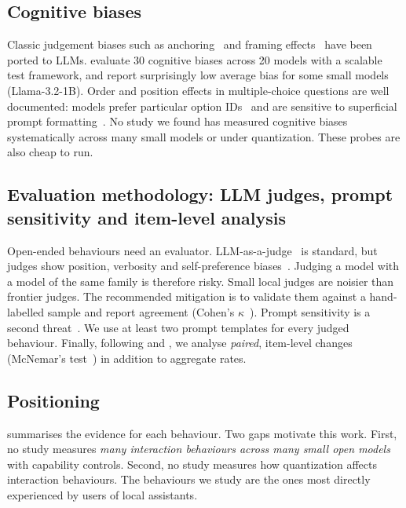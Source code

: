\subsection{Cognitive biases}
Classic judgement biases such as anchoring~\citep{tversky1974judgment} and framing
effects~\citep{tversky1981framing} have been ported to LLMs. \citet{malberg2024cognitive}
evaluate 30 cognitive biases across 20 models with a scalable test framework, and
report surprisingly low average bias for some small models (\eg Llama-3.2-1B). Order
and position effects in multiple-choice questions are well documented: models
prefer particular option IDs~\citep{zheng2024large} and are sensitive to superficial
prompt formatting~\citep{sclar2024quantifying}. No study we found has measured cognitive
biases systematically across many small models or under quantization. These probes
are also cheap to run.

\subsection{Evaluation methodology: LLM judges, prompt sensitivity and item-level analysis}
Open-ended behaviours need an evaluator. LLM-as-a-judge~\citep{zheng2023judging} is
standard, but judges show position, verbosity and self-preference
biases~\citep{wataoka2024selfpreference,ye2024justice}. Judging a model with a model of
the same family is therefore risky. Small local judges are noisier than frontier
judges. The recommended mitigation is to validate them against a hand-labelled
sample and report agreement (Cohen's $\kappa$~\citep{cohen1960coefficient}). Prompt
sensitivity is a second threat~\citep{sclar2024quantifying,syps2026}. We use at least
two prompt templates for every judged behaviour. Finally, following
\citet{hua2026uncertainty} and \citet{rath2026quantization}, we analyse \emph{paired},
item-level changes (McNemar's test~\citep{mcnemar1947note}) in addition to aggregate
rates.

\subsection{Positioning}
 summarises the evidence for each behaviour. Two gaps motivate this
work. First, no study measures \emph{many interaction behaviours across many small
open models} with capability controls. Second, no study measures how quantization
affects interaction behaviours. The behaviours we study are the ones most directly
experienced by users of local assistants.

